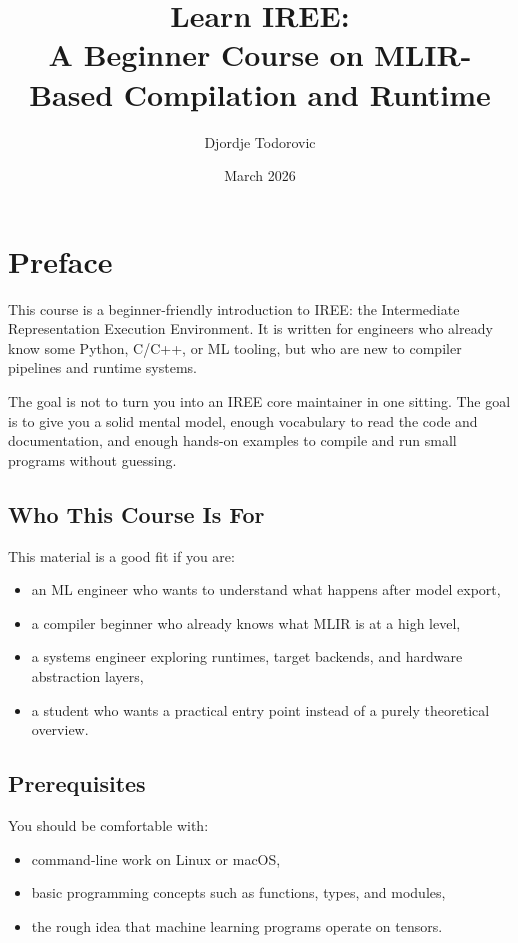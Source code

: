 \documentclass[11pt,a4paper]{article}
\title{Learn IREE:\\
A Beginner Course on MLIR-Based Compilation and Runtime}
\author{Djordje Todorovic}
\date{March 2026}
\begin{document}
\maketitle

\tableofcontents
\newpage

\section{Preface}

This course is a beginner-friendly introduction to IREE: the Intermediate Representation Execution Environment. It is written for engineers who already know some Python, C/C++, or ML tooling, but who are new to compiler pipelines and runtime systems.

The goal is not to turn you into an IREE core maintainer in one sitting. The goal is to give you a solid mental model, enough vocabulary to read the code and documentation, and enough hands-on examples to compile and run small programs without guessing.

\subsection{Who This Course Is For}

This material is a good fit if you are:
\begin{itemize}
    \item an ML engineer who wants to understand what happens after model export,
    \item a compiler beginner who already knows what MLIR is at a high level,
    \item a systems engineer exploring runtimes, target backends, and hardware abstraction layers,
    \item a student who wants a practical entry point instead of a purely theoretical overview.
\end{itemize}

\subsection{Prerequisites}

You should be comfortable with:
\begin{itemize}
    \item command-line work on Linux or macOS,
    \item basic programming concepts such as functions, types, and modules,
    \item the rough idea that machine learning programs operate on tensors.
\end{itemize}
\end{document}
